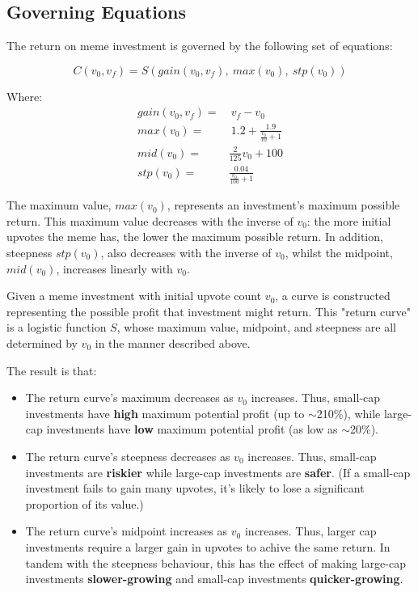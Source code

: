 \documentclass[a4paper, 12pt]{article}
\begin{document}
\subsection*{Governing Equations}
\label{sec:org69df38c}

The return on meme investment is governed by the following set of equations:

\begin{equation*}
C(v_0, v_f) = S(gain(v_0, v_f),\ max(v_0),\ stp(v_0))
\end{equation*}

Where:
\begin{align*}
gain(v_0, v_f) =& \ v_f - v_0\\
max(v_0) =& \ 1.2 + \frac{1.9}{\frac{v_0}{10}+1}\\
mid(v_0) =& \frac{2}{125}v_0 + 100 \\
stp(v_0) =& \frac{0.04}{\frac{v_0}{100} + 1}  
\end{align*}

The maximum value, \(max(v_0)\), represents an investment's maximum possible return. This maximum 
value decreases with the inverse of \(v_0\): the more initial upvotes the meme has, the lower 
the maximum possible return. In addition, steepness \(stp(v_0)\), also decreases with the inverse of \(v_0\), 
whilst the midpoint, \(mid(v_0)\), increases linearly with \(v_0\). 

Given a meme investment with initial upvote count \(v_0\), a curve is constructed representing
the possible profit that investment might return. This "return curve" is a logistic function
\(S\), whose maximum value, midpoint, and steepness are all determined by \(v_0\) in
the manner described above. 

The result is that:

\begin{itemize}
\item The return curve's maximum decreases as \(v_0\) increases. Thus, small-cap
investments have \textbf{high} maximum potential profit (up to \(\sim\)210\%), while large-cap
investments have \textbf{low} maximum potential profit (as low as \(\sim\)20\%).

\item The return curve's steepness decreases as \(v_0\) increases. Thus, small-cap
investments are \textbf{riskier} while large-cap investments are \textbf{safer}. (If a
small-cap investment fails to gain many upvotes, it's likely to lose a significant
proportion of its value.)

\item The return curve's midpoint increases as \(v_0\) increases. Thus, larger cap
investments require a larger gain in upvotes to achive the same return. In
tandem with the steepness behaviour, this has the effect of making large-cap
investments \textbf{slower-growing} and small-cap investments \textbf{quicker-growing}.
\end{itemize}
\end{document}
